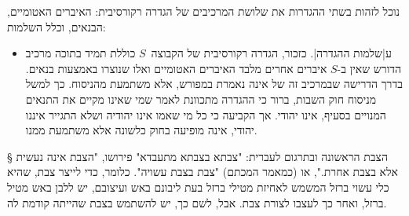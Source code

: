 נוכל לזהות בשתי ההגדרות את  שלושת המרכיבים של הגדרה רקורסיבית: האיברים
האטומיים, הבנאים, וכלל השלמות: 
\begin{itemize}
  ✦ \ע|איברים אטומיים|. בסיס הרקורסיה הוא \ע|איברים אטומיים|, כלומר איברים
  של~$S$ אשר אינם נבנים מאיברים אחרים בקבוצה:
  \begin{enumerate}
  ✦ אם נביט על סעיף 4ב' של חוק השבות כעל הגדרה רקורסיבית של קבוצת היהודים, סביר
  שנאמר שאברהם אבינו ושרה אימנו הם האיברים האטומיים של הקבוצה, כלומר הם יהודים
  בזכות עצמם.
  ✦ בהסתכלות דומה על השריעה, סביר להסיק מוחמד ואולי עוד כמה מתלמידיו, הם
  מוסלמים מכוח עצמם בלבד. כל שאר המוסלמים נקבעים בדרך אחרת.
  \end{enumerate}
  ✦ \ע|בנאי איברים|. בהגדרה השרעית הרקורסיבית של קבוצות
  המוסלמים יש שני בנאים:
  \begin{enumerate}
  ✦ הבנאי שמאפשר לקבוע כי אדם מסויים הוא מוסלמי, אם אביו מוסלמי. בנאי זה הוא בנאי
  אונארי, משום שבנאי זה מתחיל מאיבר יחיד בקבוצה (גבר שהוא מוסלמי), ומאפשר
  "לבנות" איבר חדש מהאיבר הקיים.
  ✦ הכלל המגדיר כמוסלמי כמי שאמר את השהאדה בפני שלושה מוסלמים אחרים, הוא בנאי
  טרנארי משום שבנאי זה מתסמך על שלושה איברים בקבוצה המוגדרת רקורסיבית (הלא היא
  קבוצת המוסלמים), כדי לבנות איבר חדש בקבוצה.
  \end{enumerate}
  גם חוק השבות מגדיר בנאים
  \begin{enumerate}
  ✦ בנאי אונארי. 
  אונארי (אמהות). 
  ✦ בנאי טרנרי (ככל הנראה).  החוק אמנם אינו מגדיר
  במדוייק מהו גיור, אך ברור כי הגדרה מדוייקת של הגיור, תכלול רקורסיה באמצעות בנאי
  איברים ובפרט, ידרש כי חברי בית הדין המחליט על הגיור יהיו יהודים בעצמם.
  \end{enumerate}

 \item ע|שלמות ההגדרה|. כזכור, הגדרה רקורסיבית של הקבוצה~$S$ כוללת תמיד בתוכה מרכיב
  הדורש שאין ב-$S$ איברים אחרים מלבד האיברים האטומיים ואלו שנוצרו באמצעות
  בנאים. בדרך הדרישה שבמרכיב זה של אינה נאמרת במפורש, אלא משתמעת מהניסוח. כך
  למשל מניסוח חוק השבות, ברור כי ההגדרה מתכוונת לאמר שמי שאינו מקיים את התנאים
  המנויים בסעיף, אינו יהודי. אך הקביעה כי כל מי שאמו אינו יהודיה ושלא התגייר
  איננו יהודי, אינה מופיעה בחוק כלשונה אלא משתמעת ממנו.
\end{itemize}

§ הצבת הראשונה
ובתרגום לעברית: "צבתא בצבתא מתעבדא" פירושו, "הצבת אינה נעשית אלא בצבת אחרת.",
או (כמאמר המכתם) "צבת בצבת עשויה". כלומר, כדי לייצר צבת, שהיא כלי עשוי ברזל
המשמש לאחיזת מטילי ברזל בעת ליבונם באש ועיצובם, יש ללבן באש מטיל ברזל, ואחר כך
לעצבו לצורת צבת. אבל, לשם כך, יש להשתמש בצבת שהייתה קודמת לה.

